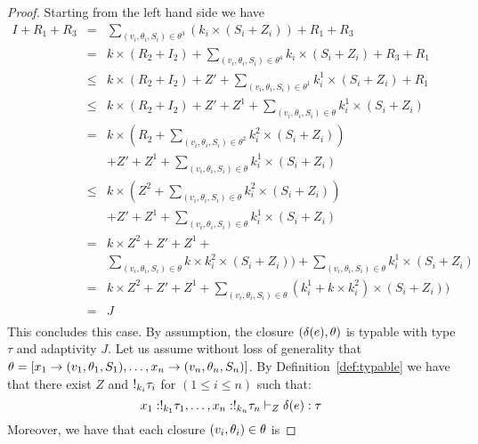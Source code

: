 \begin{proof}
Starting from the left hand side we have 
$$
\begin{array}{rcl}
I+R_1+R_3&=&
             \sum_{(v_i,\theta_i,S_i)\in\theta^3}(k_i\times(S_i+Z_i)) +R_1+R_3\\
&=&
             k\times(R_2+I_2)+\sum_{(v_i,\theta_i,S_i)\in\theta^4}k_i\times(S_i+Z_i) +R_3+R_1\\
&\leq&
    k\times(R_2+I_2)+Z'+\sum_{(v_i,\theta_i,S_i)\in\theta^1}k_i^1\times(S_i+Z_i)
    +R_1\\
&\leq&
    k\times(R_2+I_2)+Z'+Z^1+\sum_{(v_i,\theta_i,S_i)\in\theta}k_i^1\times(S_i+Z_i)\\
&=&
    k\times(R_2+\sum_{(v_i,\theta_i,S_i)\in\theta^2}k_i^2\times(S_i+Z_i))\\
&&+Z'+Z^1+\sum_{(v_i,\theta_i,S_i)\in\theta}k_i^1\times(S_i+Z_i)\\
&\leq&
    k\times(Z^2+\sum_{(v_i,\theta_i,S_i)\in\theta}k_i^2\times(S_i+Z_i))\\
&&+Z'+Z^1+\sum_{(v_i,\theta_i,S_i)\in\theta}k_i^1\times(S_i+Z_i)\\
&=&
    k\times Z^2 +Z'+Z^1+\\
&&\sum_{(v_i,\theta_i,S_i)\in\theta}k\times k_i^2\times(S_i+Z_i)) +\sum_{(v_i,\theta_i,S_i)\in\theta}k_i^1\times(S_i+Z_i)\\
&=&
    k\times Z^2 +Z'+Z^1+\sum_{(v_i,\theta_i,S_i)\in\theta}(k_i^1
    +k\times k_i^2)\times(S_i+Z_i)) \\
&=&J\\
\end{array}
$$
This concludes this case.
   By assumption, the closure $(\delta(e) , \theta)$ is
   typable with type $\tau$ and adaptivity $J$.  
Let us assume without
   loss of generality that
   $\theta=[x_1 \to (v_1 , \theta_1 ,
   S_1 ) , \ldots, x_n \to (v_n, \theta_n, S_n )]$.  By
   Definition~\ref{def:typable} we have that there exist $Z$ and 
   $!_{k_i} \tau_i$ for $(1\leq i\leq n)$ such that:
     \begin{equation}
\label{fact:delta}
       x_1 : !_{k_1} \tau_1, \ldots, x_n:!_{k_n} \tau_n
\vdash_{Z} \delta(e) : \tau 
\end{equation}
    Moreover, we have that each closure $ (v_i, \theta_i)\in\theta $ is

\end{proof}
